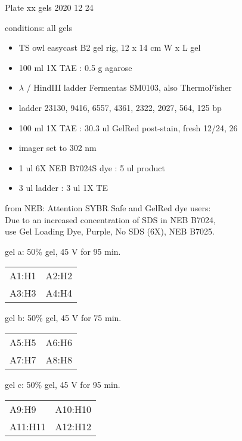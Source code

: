 \documentclass{article}
\begin{document}
\sffamily
{\huge Plate xx gels 2020 12 24}

conditions: all gels
\begin{itemize}
    \item TS owl easycast B2 gel rig, 12 x 14 cm W x L gel
    \item 100 ml 1X TAE : 0.5 g agarose
    \item $\lambda$ / HindIII ladder Fermentas SM0103, also ThermoFisher
    \item ladder 23130, 9416, 6557, 4361, 2322, 2027, 564, 125 bp
    \item 100 ml 1X TAE : 30.3 ul GelRed post-stain, fresh 12/24, 26
    \item imager set to 302 nm
    \item 1 ul 6X NEB B7024S dye : 5 ul product
    \item 3 ul ladder : 3 ul 1X TE
\end{itemize}

\hfill

from NEB: Attention SYBR Safe and GelRed dye users: \\
Due to an increased concentration of SDS in NEB B7024, \\
use Gel Loading Dye, Purple, No SDS (6X), NEB B7025. \\


\hfill

gel a: 50\% gel, 45 V for 95 min. \\
\begin{tabular}[c]{l l}
\hline
A1:H1   &  A2:H2 \\
A3:H3   &   A4:H4  \\
\end{tabular}


gel b: 50\% gel, 45 V for 75 min. \\
\begin{tabular}[c]{l l}
\hline
A5:H5   &  A6:H6 \\
A7:H7   &  A8:H8 \\
\end{tabular}

gel c: 50\% gel, 45 V for 95 min. \\
\begin{tabular}[c]{l l}
\hline
A9:H9 & A10:H10  \\
A11:H11 & A12:H12  \\
\end{tabular}
\end{document}
